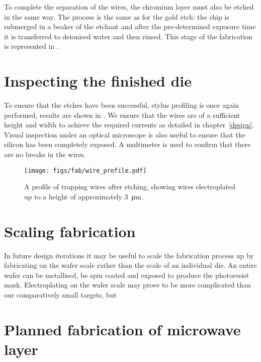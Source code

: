%
To complete the separation of the wires, the chromium layer must also be etched
in the same way. The process is the same as for the gold etch: the chip is
submerged in a beaker of the etchant and after the pre-determined exposure time
it is transferred to deionised water and then rinsed. This stage of the
fabrication is represented in . 

\section{Inspecting the finished die}

To ensure that the etches have been successful, stylus profiling is once again
performed, results are shown in . We ensure that
the wires are of a sufficient height and width to achieve the required currents
as detailed in chapter~\ref{design}. Visual inspection under an optical
microscope is also useful to ensure that the silicon has been completely
exposed. A multimeter is used to confirm that there are no breaks in the wires.

\begin{figure}
\centering
  \texttt{[image: figs/fab/wire\_profile.pdf]}
  \caption{A profile of trapping wires after etching, showing wires
  electroplated up to a height of approximately \SI{3}{\micro\meter}.
  }
  \label{fab:fig:endprofile}
\end{figure}

\section{Scaling fabrication}

In future design iterations it may be useful to scale the fabrication process
up by fabricating on the wafer scale rather than the scale of an individual
die. An entire wafer can be metallised, be spin coated and exposed to
produce the photoresist mask. Electroplating on the wafer scale may prove to be
more complicated than our comparatively small targets, but 

\section{Planned fabrication of microwave layer}
\label{fab:planned}

